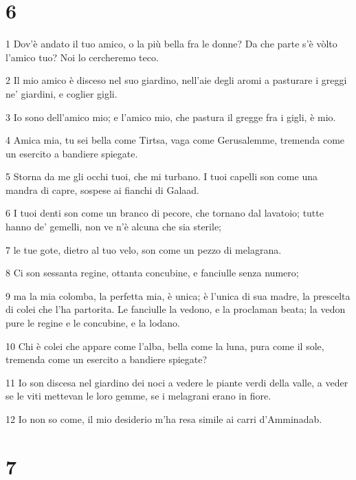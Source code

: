 \chapter{6}

\par 1 Dov'è andato il tuo amico, o la più bella fra le donne? Da che parte s'è vòlto l'amico tuo? Noi lo cercheremo teco.
\par 2 Il mio amico è disceso nel suo giardino, nell'aie degli aromi a pasturare i greggi ne' giardini, e coglier gigli.
\par 3 Io sono dell'amico mio; e l'amico mio, che pastura il gregge fra i gigli, è mio.
\par 4 Amica mia, tu sei bella come Tirtsa, vaga come Gerusalemme, tremenda come un esercito a bandiere spiegate.
\par 5 Storna da me gli occhi tuoi, che mi turbano. I tuoi capelli son come una mandra di capre, sospese ai fianchi di Galaad.
\par 6 I tuoi denti son come un branco di pecore, che tornano dal lavatoio; tutte hanno de' gemelli, non ve n'è alcuna che sia sterile;
\par 7 le tue gote, dietro al tuo velo, son come un pezzo di melagrana.
\par 8 Ci son sessanta regine, ottanta concubine, e fanciulle senza numero;
\par 9 ma la mia colomba, la perfetta mia, è unica; è l'unica di sua madre, la prescelta di colei che l'ha partorita. Le fanciulle la vedono, e la proclaman beata; la vedon pure le regine e le concubine, e la lodano.
\par 10 Chi è colei che appare come l'alba, bella come la luna, pura come il sole, tremenda come un esercito a bandiere spiegate?
\par 11 Io son discesa nel giardino dei noci a vedere le piante verdi della valle, a veder se le viti mettevan le loro gemme, se i melagrani erano in fiore.
\par 12 Io non so come, il mio desiderio m'ha resa simile ai carri d'Amminadab.

\chapter{7}

